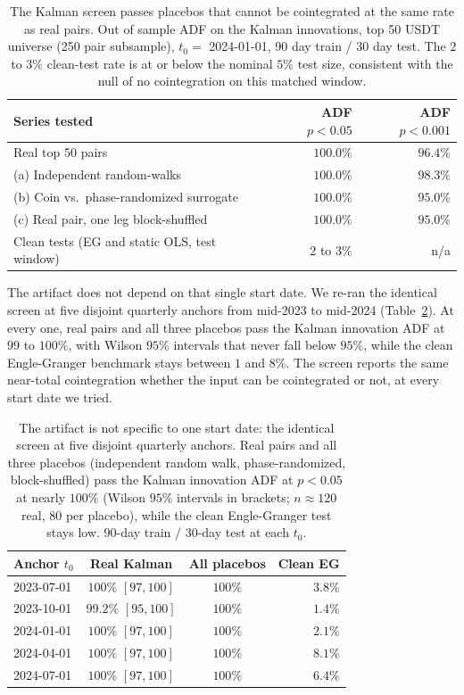 \documentclass[11pt]{article}
\begin{document}
\begin{table}[h]
\centering
\caption{The Kalman screen passes placebos that cannot be cointegrated at the same rate as
real pairs. Out of sample ADF on the Kalman innovations, top 50 USDT universe (250 pair
subsample), $t_0 =$
2024-01-01, 90 day train / 30 day test. The $2$ to $3\%$ clean-test rate is at or below the
nominal $5\%$ test size, consistent with the null of no cointegration on this matched window.}
\label{tab:kalman-placebo}
\begin{tabular}{lrr}
\toprule
Series tested & ADF $p<0.05$ & ADF $p<0.001$ \\
\midrule
Real top 50 pairs & $100.0\%$ & $96.4\%$ \\
(a) Independent random-walks & $100.0\%$ & $98.3\%$ \\
(b) Coin vs.\ phase-randomized surrogate & $100.0\%$ & $95.0\%$ \\
(c) Real pair, one leg block-shuffled & $100.0\%$ & $95.0\%$ \\
\midrule
Clean tests (EG and static OLS, test window) & $2$ to $3\%$ & n/a \\
\bottomrule
\end{tabular}
\end{table}

The artifact does not depend on that single start date. We re-ran the identical screen at
five disjoint quarterly anchors from mid-2023 to mid-2024
(Table~\ref{tab:kalman-anchors}). At every one, real pairs and all three placebos pass the
Kalman innovation ADF at $99$ to $100\%$, with Wilson $95\%$ intervals that never fall
below $95\%$, while the clean Engle-Granger benchmark stays between $1$ and $8\%$. The
screen reports the same near-total cointegration whether the input can be cointegrated or
not, at every start date we tried.

\begin{table}[h]
\centering
\caption{The artifact is not specific to one start date: the identical screen at five
disjoint quarterly anchors. Real pairs and all three placebos (independent random walk,
phase-randomized, block-shuffled) pass the Kalman innovation ADF at $p<0.05$ at nearly
$100\%$ (Wilson $95\%$ intervals in brackets; $n \approx 120$ real, $80$ per placebo),
while the clean Engle-Granger test stays low. $90$-day train / $30$-day test at each
$t_0$.}
\label{tab:kalman-anchors}
\begin{tabular}{lccr}
\toprule
Anchor $t_0$ & Real Kalman & All placebos & Clean EG \\
\midrule
2023-07-01 & $100\%$ $[97,100]$ & $100\%$ & $3.8\%$ \\
2023-10-01 & $99.2\%$ $[95,100]$ & $100\%$ & $1.4\%$ \\
2024-01-01 & $100\%$ $[97,100]$ & $100\%$ & $2.1\%$ \\
2024-04-01 & $100\%$ $[97,100]$ & $100\%$ & $8.1\%$ \\
2024-07-01 & $100\%$ $[97,100]$ & $100\%$ & $6.4\%$ \\
\bottomrule
\end{tabular}
\end{table}
\end{document}
